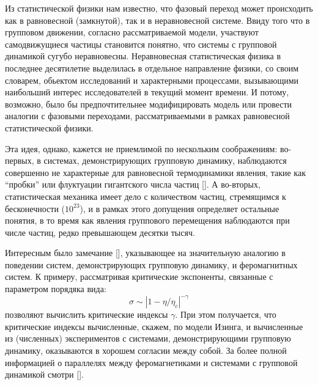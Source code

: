     Из статистической физики нам известно, что фазовый переход может происходить как в равновесной (замкнутой), так и в неравновесной системе. Ввиду того что в групповом движении, согласно рассматриваемой модели, участвуют самодвижущиеся частицы становится понятно, что системы с групповой динамикой сугубо неравновесны. Неравновесная статистическая физика в последнее десятилетие выделилась в отдельное направление физики, со своим словарем, обьектом исследований и характерными процессами, вызывающими наибольший интерес исследователей в текущий момент времени. И потому, возможно, было бы предпочтительнее модифицировать модель или провести аналогии с фазовыми переходами, рассматриваемыми в рамках равновесной статистической физики.~\cite{vicsek2012}

    Эта идея, однако, кажется не приемлимой по нескольким соображениям: во-первых, в системах, демонстрирующих групповую динамику, наблюдаются совершенно не характерные для равновесной термодинамики явления, такие как ``пробки'' или флуктуации гигантского числа частиц []. А во-вторых, статистическая механика имеет дело с количеством частиц, стремящимся к бесконечности ($10^{23}$), и в рамках этого допущения определяет остальные понятия, в то время как явления группового перемещения наблюдаются при числе частиц, редко превышающем десятки тысяч.

    Интересным было замечание [], указывающее на значительную аналогию в поведении систем, демонстрирующих групповую динамику, и феромагнитных систем. К примеру, рассматривая критические экспоненты, связанные с параметром порядяка вида:
    \begin{equation}
        \sigma \sim |1-\eta/\eta_c|^{-\gamma}
    \end{equation}
    позволяют вычислить критические индексы $\gamma$. При этом получается, что критические индексы вычисленные, скажем, по модели Изинга, и вычисленные из (численных) экспериментов с системами, демонстрирующими групповую динамику, оказываются в хорошем согласии между собой. За более полной информацией о параллелях между феромагнетиками и системами с групповой динамикой смотри [].

